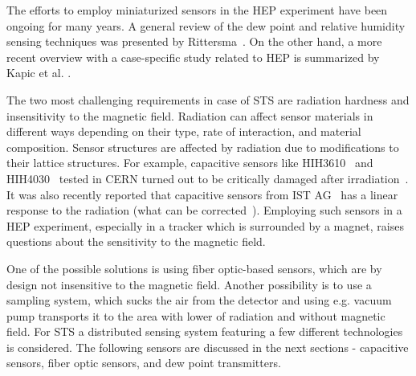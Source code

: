 The efforts to employ miniaturized sensors in the \gls{HEP} experiment have been ongoing for many years. A general review of the dew point and relative humidity sensing techniques was presented by Rittersma~\cite{RITTERSMA}. On the other hand, a more recent overview with a case-specific study related to \gls{HEP} is summarized by Kapic et al. \cite{Kapic}.

The two most challenging requirements in case of \gls{STS} are radiation hardness and insensitivity to the magnetic field. Radiation can affect sensor materials in different ways depending on their type, rate of interaction, and material composition. Sensor structures are affected by radiation due to modifications to their lattice structures. For example, capacitive sensors like HIH3610~\cite{HIH3610} and HIH4030~\cite{HIH4030} tested in CERN turned out to be critically damaged after irradiation~\cite{Berruti}. It was also recently reported that capacitive sensors from IST AG~\cite{MK33} has a linear response to the radiation (what can be corrected~\cite{Kapic_sensor}). Employing such sensors in a \gls{HEP} experiment, especially in a tracker which is surrounded by a magnet, raises questions about the sensitivity to the magnetic field. 

One of the possible solutions is using fiber optic-based sensors, which are by design not insensitive to the magnetic field. Another possibility is to use a sampling system, which sucks the air from the detector and using e.g. vacuum pump transports it to the area with lower of radiation and without magnetic field.
For \gls{STS} a distributed sensing system featuring a few different technologies is considered. The following sensors are discussed in the next sections -  capacitive sensors, fiber optic sensors, and dew point transmitters. 


